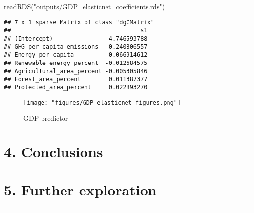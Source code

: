 \documentclass[
]{article}
\newenvironment{Shaded}{\begin{snugshade}}{\end{snugshade}}
\newcommand{\FunctionTok}[1]{\textcolor[rgb]{0.00,0.00,0.00}{#1}}
\newcommand{\NormalTok}[1]{#1}
\newcommand{\StringTok}[1]{\textcolor[rgb]{0.31,0.60,0.02}{#1}}
\begin{document}
\begin{Shaded}
\begin{Highlighting}[]
\FunctionTok{readRDS}\NormalTok{(}\StringTok{"outputs/GDP\_elasticnet\_coefficients.rds"}\NormalTok{)}
\end{Highlighting}
\end{Shaded}

\begin{verbatim}
## 7 x 1 sparse Matrix of class "dgCMatrix"
##                                     s1
## (Intercept)               -4.746593788
## GHG_per_capita_emissions   0.240806557
## Energy_per_capita          0.066914612
## Renewable_energy_percent  -0.012684575
## Agricultural_area_percent -0.005305846
## Forest_area_percent        0.011387377
## Protected_area_percent     0.022893270
\end{verbatim}

\begin{figure}
\centering
\texttt{[image: "figures/GDP\_elasticnet\_figures.png"]}
\caption{GDP predictor}
\end{figure}

\hypertarget{conclusions}{%
\section{4. Conclusions}\label{conclusions}}

\hypertarget{further-exploration}{%
\section{5. Further exploration}\label{further-exploration}}

\begin{center}\rule{0.5\linewidth}{0.5pt}\end{center}
\end{document}
